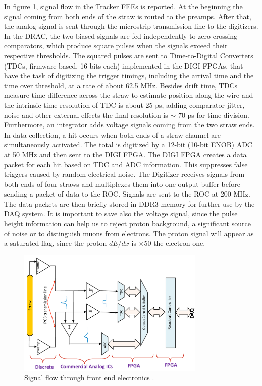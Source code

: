 In figure \ref{fig:flowfee}, signal flow in the Tracker FEEs is reported. At the beginning the signal coming from both ends of the straw is routed to the preamps. After that, the analog signal is sent through the microstrip transmission line to the digitizers. In the DRAC, the two biased signals are fed independently to zero-crossing comparators, which produce square pulses when the signals exceed their respective thresholds. The squared pulses are sent to Time-to-Digital Converters (TDCs, firmware based, 16 bits each) implemented in the DIGI FPGAs, that have the task of digitizing the trigger timings, including the arrival time and the time over threshold, at a rate of about 62.5 MHz. Besides drift time, TDCs measure time difference across the straw to estimate position along the wire and the intrinsic time resolution of TDC is about 25 ps, adding comparator jitter, noise and other external effects the final resolution is $\sim$ 70 ps for time division. Furthermore, an integrator adds voltage signals coming from the two straw ends. In data collection, a hit occurs when both ends of a straw channel are simultaneously activated. The total is digitized by a 12-bit (10-bit ENOB) ADC at 50 MHz and then sent to the DIGI FPGA. The DIGI FPGA creates a data packet for each hit based on TDC and ADC information. This suppresses false triggers caused by random electrical noise. The Digitizer receives signals from both ends of four straws and multiplexes them into one output buffer before sending a packet of data to the ROC. Signals are sent to the ROC at 200 MHz. The data packets are then briefly stored in DDR3 memory for further use by the DAQ system. It is important to save also the voltage signal, since the pulse height information can help us to reject proton background, a significant source of noise or to distinguish muons from electrons. The proton signal will appear as a saturated flag, since the proton $dE/dx$ is $\times$50 the electron one.
\begin{figure}[!h]
\centering
\includegraphics[width =0.8\textwidth]{figures/png/Screenshot_20240203_135048.png}
\caption{Signal flow through front end electronics \cite{bartoszek2015mu2e}.}
\label{fig:flowfee}
\end{figure}

